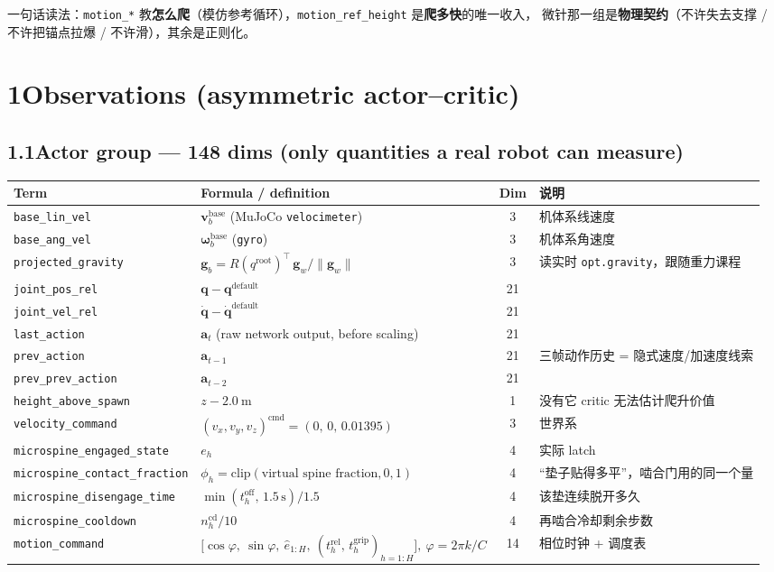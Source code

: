 \documentclass[11pt]{article}
\newcommand{\term}[1]{\texttt{\small #1}}
\begin{document}
一句话读法：\term{motion\_*} 教\textbf{怎么爬}（模仿参考循环），\term{motion\_ref\_height} 是\textbf{爬多快}的唯一收入，
微针那一组是\textbf{物理契约}（不许失去支撑 / 不许把锚点拉爆 / 不许滑），其余是正则化。

\newpage
\section*{1\quad Observations (asymmetric actor--critic)}

\subsection*{1.1\quad Actor group — 148 dims (only quantities a real robot can measure)}
\begin{center}\small
\begin{tabular}{@{}llcl@{}}
\toprule
Term & Formula / definition & Dim & 说明 \\
\midrule
\term{base\_lin\_vel} & $\bm v^{\mathrm{base}}_b$ (MuJoCo \term{velocimeter}) & 3 & 机体系线速度 \\
\term{base\_ang\_vel} & $\bm\omega^{\mathrm{base}}_b$ (\term{gyro}) & 3 & 机体系角速度 \\
\term{projected\_gravity} &
  $\bm g_b = R(q^{\mathrm{root}})^{\!\top}\,\bm g_w/\lVert \bm g_w\rVert$ & 3 &
  读实时 \term{opt.gravity}，跟随重力课程 \\
\term{joint\_pos\_rel} & $\bm q - \bm q^{\mathrm{default}}$ & 21 & \\
\term{joint\_vel\_rel} & $\dot{\bm q} - \dot{\bm q}^{\mathrm{default}}$ & 21 & \\
\term{last\_action} & $\bm a_t$ (raw network output, before scaling) & 21 & \\
\term{prev\_action} & $\bm a_{t-1}$ & 21 & 三帧动作历史 = 隐式速度/加速度线索 \\
\term{prev\_prev\_action} & $\bm a_{t-2}$ & 21 & \\
\term{height\_above\_spawn} & $z - 2.0\ \mathrm{m}$ & 1 & 没有它 critic 无法估计爬升价值 \\
\term{velocity\_command} & $(v_x,v_y,v_z)^{\mathrm{cmd}} = (0,\,0,\,0.01395)$ & 3 & 世界系 \\
\term{microspine\_engaged\_state} & $e_h$ & 4 & 实际 latch \\
\term{microspine\_contact\_fraction} & $\phi_h=\mathrm{clip}(\text{virtual spine fraction},0,1)$ & 4 & “垫子贴得多平”，啮合门用的同一个量 \\
\term{microspine\_disengage\_time} & $\min(t^{\mathrm{off}}_h,\,1.5\,\mathrm{s})/1.5$ & 4 & 该垫连续脱开多久 \\
\term{microspine\_cooldown} & $n^{\mathrm{cd}}_h/10$ & 4 & 再啮合冷却剩余步数 \\
\term{motion\_command} &
  $\big[\cos\varphi,\ \sin\varphi,\ \hat e_{1:H},\ (t^{\mathrm{rel}}_h,\,t^{\mathrm{grip}}_h)_{h=1:H}\big],\ \varphi = 2\pi k/C$ & 14 &
  相位时钟 + 调度表 \\
\bottomrule
\end{tabular}
\end{center}
\end{document}
